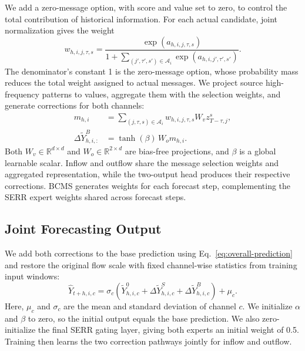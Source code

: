 We add a zero-message option, with score and value set to zero, to control the total contribution of historical information. For each actual candidate, joint normalization gives the weight
\begin{equation}
\label{eq:joint-message-softmax}
w_{h,i,j,\tau,s}
=\frac{\exp(a_{h,i,j,\tau,s})}
{1+\displaystyle\sum_{(j',\tau',s')\in\mathcal{A}_i}\exp(a_{h,i,j',\tau',s'})}.
\end{equation}
The denominator's constant 1 is the zero-message option, whose probability mass reduces the total weight assigned to actual messages. We project source high-frequency patterns to values, aggregate them with the selection weights, and generate corrections for both channels:
\begin{equation}
\label{eq:bcms-residual}
\begin{aligned}
m_{h,i}&=\sum_{(j,\tau,s)\in\mathcal{A}_i}
w_{h,i,j,\tau,s}W_vz^s_{T-\tau,j},\\
\Delta\widetilde{Y}^{B}_{h,i,:}&=\tanh(\beta)\,W_o m_{h,i}.
\end{aligned}
\end{equation}
Both \(W_v\in\mathbb{R}^{d\times d}\) and \(W_o\in\mathbb{R}^{2\times d}\) are bias-free projections, and \(\beta\) is a global learnable scalar. Inflow and outflow share the message selection weights and aggregated representation, while the two-output head produces their respective corrections. BCMS generates weights for each forecast step, complementing the SERR expert weights shared across forecast steps.

\subsection{Joint Forecasting Output}\label{sec:joint-output}

We add both corrections to the base prediction using Eq.~\eqref{eq:overall-prediction} and restore the original flow scale with fixed channel-wise statistics from training input windows:
\begin{equation}
\label{eq:inverse-scaling}
\widehat{Y}_{t+h,i,c}
=\sigma_c\left(\widetilde{Y}^{0}_{h,i,c}
+\Delta\widetilde{Y}^{S}_{h,i,c}+\Delta\widetilde{Y}^{B}_{h,i,c}\right)+\mu_c.
\end{equation}
Here, \(\mu_c\) and \(\sigma_c\) are the mean and standard deviation of channel \(c\). We initialize \(\alpha\) and \(\beta\) to zero, so the initial output equals the base prediction. We also zero-initialize the final SERR gating layer, giving both experts an initial weight of 0.5. Training then learns the two correction pathways jointly for inflow and outflow.
